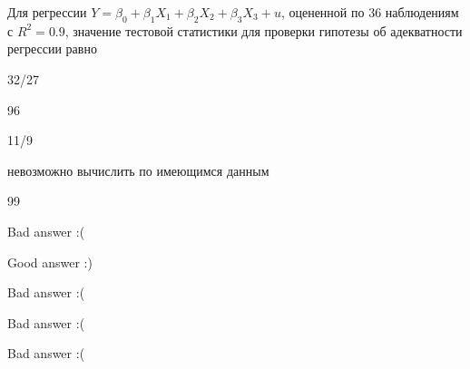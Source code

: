 
\begin{question}
Для регрессии \(Y = \beta_0 + \beta_1 X_1 + \beta_2 X_2 + \beta_3 X_3 + u\), оцененной по 36 наблюдениям с \(R^2 = 0.9\), значение тестовой статистики для проверки гипотезы об адекватности регрессии равно
\begin{answerlist}
  \item 32/27
  \item 96
  \item 11/9
  \item невозможно вычислить по имеющимся данным
  \item 99
\end{answerlist}
\end{question}

\begin{solution}
\begin{answerlist}
  \item Bad answer :(
  \item Good answer :)
  \item Bad answer :(
  \item Bad answer :(
  \item Bad answer :(
\end{answerlist}
\end{solution}

